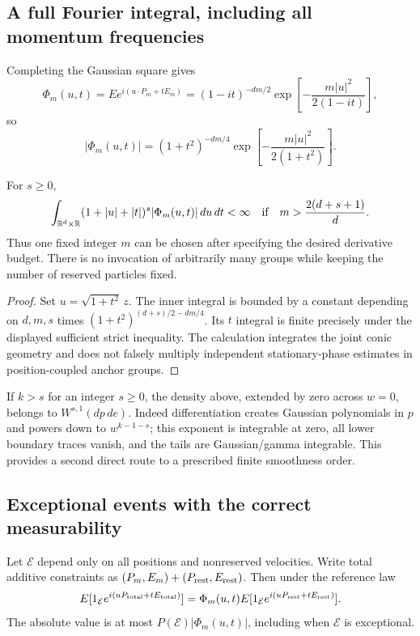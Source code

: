 \subsection{A full Fourier integral, including all momentum frequencies}
Completing the Gaussian square gives
\[
 \Phi_m(u,t)=E e^{i(u\cdot P_m+tE_m)}
 =(1-it)^{-dm/2}\exp\left[-\frac{m|u|^2}{2(1-it)}\right],
\]
so
\[
 |\Phi_m(u,t)|=(1+t^2)^{-dm/4}
       \exp\left[-\frac{m|u|^2}{2(1+t^2)}\right].
\]

\begin{theorem}
\label{thm:r33-b1-fourier}
For $s\ge0$,
\[
 \int_{\mathbb R^d\times\mathbb R}
  (1+|u|+|t|)^s|\Phi_m(u,t)|\,du\,dt<\infty
 \quad\hbox{if}\quad m>\frac{2(d+s+1)}d.
\]
Thus one fixed integer $m$ can be chosen after specifying the desired derivative budget. There is no invocation of arbitrarily many groups while keeping the number of reserved particles fixed.
\end{theorem}

\begin{proof}
Set $u=\sqrt{1+t^2}\,z$. The inner integral is bounded by a constant depending on $d,m,s$ times
$(1+t^2)^{(d+s)/2-dm/4}$. Its $t$ integral is finite precisely under the displayed sufficient strict inequality. The calculation integrates the joint conic geometry and does not falsely multiply independent stationary-phase estimates in position-coupled anchor groups.
\end{proof}

If $k>s$ for an integer $s\ge0$, the density above, extended by zero across $w=0$, belongs to $W^{s,1}(dp\,de)$. Indeed differentiation creates Gaussian polynomials in $p$ and powers down to $w^{k-1-s}$; this exponent is integrable at zero, all lower boundary traces vanish, and the tails are Gaussian/gamma integrable. This provides a second direct route to a prescribed finite smoothness order.

\subsection{Exceptional events with the correct measurability}
\begin{proposition}
\label{prop:r33-b1-event}
Let $\mathcal E$ depend only on all positions and nonreserved velocities. Write total additive constraints as $(P_m,E_m)+(P_{\rm rest},E_{\rm rest})$. Then under the reference law
\[
 E[1_{\mathcal E}e^{i(uP_{\rm total}+tE_{\rm total})}]
 =\Phi_m(u,t)E[1_{\mathcal E}e^{i(uP_{\rm rest}+tE_{\rm rest})}].
\]
The absolute value is at most $P(\mathcal E)|\Phi_m(u,t)|$, including when $\mathcal E$ is exceptional.
\end{proposition}


